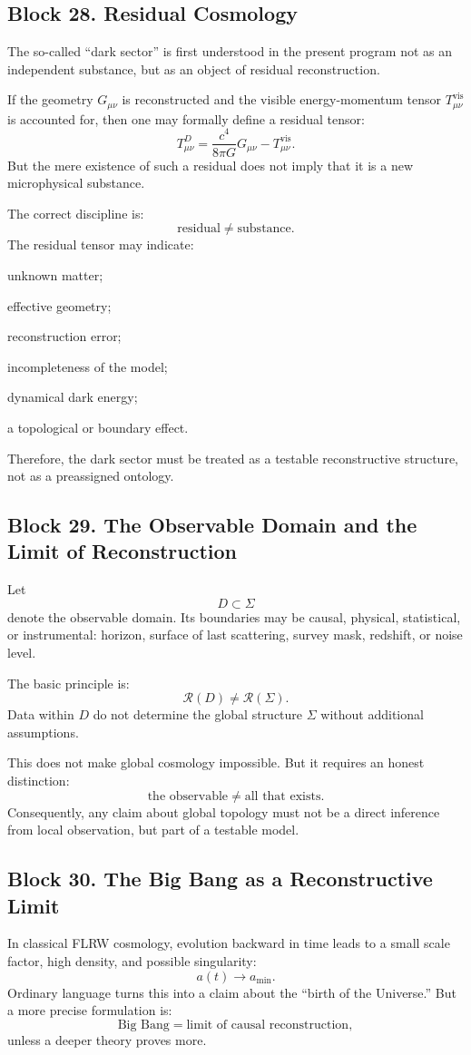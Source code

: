 \documentclass[12pt,a4paper]{article}
\theoremstyle{definition}
\begin{document}
\subsection{Block 28. Residual Cosmology}
The so-called ``dark sector'' is first understood in the present program not as an independent substance, but as an object of residual reconstruction.

If the geometry \(G_{\mu\nu}\) is reconstructed and the visible energy-momentum tensor \(T^{\mathrm{vis}}_{\mu\nu}\) is accounted for, then one may formally define a residual tensor:
\[
T^D_{\mu\nu}
=
\frac{c^4}{8\pi G}G_{\mu\nu}
-
T^{\mathrm{vis}}_{\mu\nu}.
\]
But the mere existence of such a residual does not imply that it is a new microphysical substance.

The correct discipline is:
\[
\text{residual}
\neq
\text{substance}.
\]
The residual tensor may indicate:

unknown matter;

effective geometry;

reconstruction error;

incompleteness of the model;

dynamical dark energy;

a topological or boundary effect.

Therefore, the dark sector must be treated as a testable reconstructive structure, not as a preassigned ontology.



\subsection{Block 29. The Observable Domain and the Limit of Reconstruction}
Let
\[
D\subset\Sigma
\]
denote the observable domain. Its boundaries may be causal, physical, statistical, or instrumental: horizon, surface of last scattering, survey mask, redshift, or noise level.

The basic principle is:
\[
\mathcal R(D)\neq \mathcal R(\Sigma).
\]
Data within \(D\) do not determine the global structure \(\Sigma\) without additional assumptions.

This does not make global cosmology impossible. But it requires an honest distinction:
\[
\text{the observable}
\neq
\text{all that exists}.
\]
Consequently, any claim about global topology must not be a direct inference from local observation, but part of a testable model.



\subsection{Block 30. The Big Bang as a Reconstructive Limit}
In classical FLRW cosmology, evolution backward in time leads to a small scale factor, high density, and possible singularity:
\[
a(t)\to a_{\min}.
\]
Ordinary language turns this into a claim about the ``birth of the Universe.'' But a more precise formulation is:
\[
\text{Big Bang}
=
\text{limit of causal reconstruction},
\]
unless a deeper theory proves more.
\end{document}
